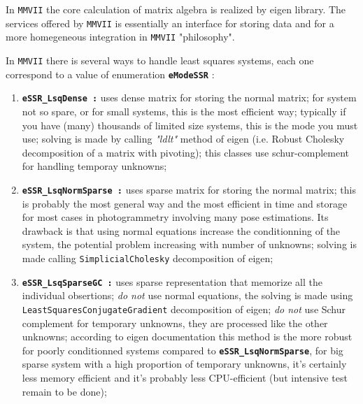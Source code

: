 In {\tt MMVII} the core calculation of matrix algebra is realized
by eigen library. The services offered by {\tt MMVII} is essentially
an interface for storing data and for a more homegeneous integration
in {\tt MMVII} "philosophy".

In {\tt MMVII} there is several ways to handle least squares systems, each
one correspond to a value of enumeration {\bf \tt eModeSSR} :

\begin{enumerate}

    \item{\bf \tt eSSR\_LsqDense :}
          uses dense matrix for storing the normal matrix; for system not so spare,
          or for small systems, this is the most efficient way; typically if you have
          (many) thousands of limited size systems, this is the mode you must use; solving
          is made by calling \emph{"ldlt"} method of eigen (i.e. Robust Cholesky 
          decomposition of a matrix with pivoting); this classes use schur-complement
          for handling temporay unknowns;

    \item {\bf \tt eSSR\_LsqNormSparse :}
          uses sparse matrix for storing the normal matrix; this is probably the most
          general way and the most efficient in time and storage for most cases in 
          photogrammetry involving many pose estimations. Its
          drawback is that using normal equations increase the conditionning of the
          system, the potential problem increasing with number of unknowns; 
          solving is made calling  {\tt SimplicialCholesky} decomposition of eigen;

    \item {\bf \tt eSSR\_LsqSparseGC :}
          uses sparse representation that memorize all the individual obsertions;
          \emph{do not} use normal equations, the solving is made using
          {\tt LeastSquaresConjugateGradient} decomposition of eigen;
          \emph{do not} use Schur complement for temporary unknowns, they
          are processed like the other unknowns; according to eigen documentation
          this method is the more robust for poorly conditionned systems 
          compared to {\bf \tt eSSR\_LsqNormSparse}, for big
          sparse system with a high proportion of temporary unknowns, 
          it's certainly less memory  efficient and it's probably
          less CPU-efficient (but intensive test remain to be done);

\end{enumerate}

